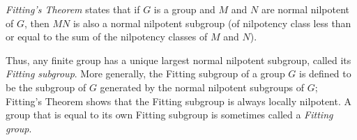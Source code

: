 \documentclass[12pt]{article}
\begin{document}

\emph{Fitting's Theorem} states that if $G$ is a group
and $M$ and $N$ are normal nilpotent  of $G$,
then $MN$ is also a normal nilpotent subgroup
(of nilpotency class less than or equal to
the sum of the nilpotency classes of $M$ and $N$).

Thus, any finite group has a unique largest normal nilpotent subgroup, called its \emph{Fitting subgroup}.
More generally, the Fitting subgroup of a group $G$ is defined to be the subgroup of $G$ generated by the normal nilpotent subgroups of $G$;
Fitting's Theorem shows that the Fitting subgroup is always locally nilpotent.
A group that is equal to its own Fitting subgroup is sometimes called a \emph{Fitting group}.
\end{document}
